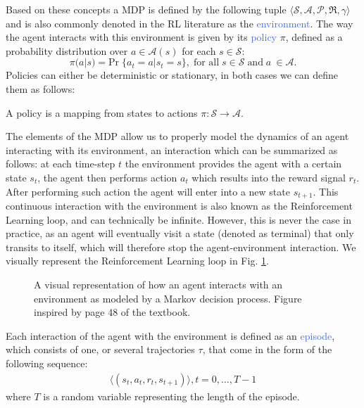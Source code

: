 Based on these concepts a MDP is defined by the following tuple $\langle\mathcal{S}, \mathcal{A}, \mathcal{P}, \Re, \gamma\rangle$ and is also commonly denoted in the RL literature as the \textcolor{RoyalBlue}{environment}. The way the agent interacts with this environment is given by its \textcolor{RoyalBlue}{policy} $\pi$, defined as a probability distribution over $a \in \mathcal{A}(s)$ for each $s \in \mathcal{S}$:
\begin{equation}
	\pi(a|s) = \text{Pr}\; \{a_t = a | s_t = s\}, \; \text{for all}\; s \in \mathcal{S}\; \text{and}\; a\ \in \mathcal{A}. 
\end{equation}
Policies can either be deterministic or stationary, in both cases we can define them as follows:
\begin{definition}
	A policy is a mapping from states to actions $\pi:\mathcal{S}\rightarrow\mathcal{A}$. 
\end{definition}
The elements of the MDP allow us to properly model the dynamics of an agent interacting with its environment, an interaction which can be summarized as follows: at each time-step $t$ the environment provides the agent with a certain state $s_t$, the agent then performs action $a_t$ which results into the reward signal $r_{t}$. After performing such action the agent will enter into a new state $s_{t+1}$. This continuous interaction with the environment is also known as the Reinforcement Learning loop, and can technically be infinite. However, this is never the case in practice, as an agent will eventually visit a state (denoted as terminal) that only transits to itself, which will therefore stop the agent-environment interaction. We visually represent the Reinforcement Learning loop in Fig. \ref{fig:rl_loop}.

\begin{figure}[htb!]
	\centering
	
\caption{A visual representation of how an agent interacts with an environment as modeled by a Markov decision process. Figure inspired by page 48 of the \citet{sutton2018reinforcement} textbook.}
  \label{fig:rl_loop}
\end{figure}

Each interaction of the agent with the environment is defined as an \textcolor{RoyalBlue}{episode}, which consists of one, or several trajectories $\tau$, that come in the form of the following sequence:
\begin{align}
	\langle(s_t,a_t,r_t,s_{t+1})\rangle,t=0,\ldots,T-1
\end{align}
where $T$ is a random variable representing the length of the episode.

